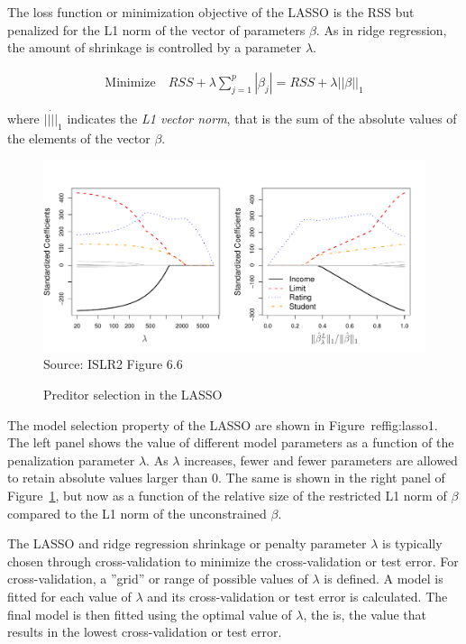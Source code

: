 The loss function or minimization objective of the LASSO is the RSS but penalized for the L1 norm of the vector of parameters $\beta$. As in ridge regression, the amount of shrinkage is controlled by a parameter $\lambda$.

\begin{align*}
\text{Minimize} \quad RSS + \lambda \sum_{j=1}^p |\beta_j| = RSS + \lambda ||\beta||_1
\end{align*}

\noindent where $||\dot||_1$ indicates the \emph{L1 vector norm}, that is the sum of the absolute values of the elements of the vector $\beta$.

\begin{figure}
\centering
\includegraphics[width=.85\textwidth]{../class11/Figures_Chapters_1-6/Chapter6/6_6.pdf} \\

\scriptsize Source: ISLR2 Figure 6.6
\caption{Preditor selection in the LASSO}
\label{fig:lasso1}
\end{figure}

The model selection property of the LASSO are shown in Figure~ref{fig:lasso1}. The left panel shows the value of different model parameters as a function of the penalization parameter $\lambda$. As $\lambda$ increases, fewer and fewer parameters are allowed to retain absolute values larger than 0. The same is shown in the right panel of Figure~\ref{fig:lasso1}, but now as a function of the relative size of the restricted L1 norm of $\beta$ compared to the L1 norm of the unconstrained $\beta$.

The LASSO and ridge regression shrinkage or penalty parameter $\lambda$ is typically chosen through cross-validation to minimize the cross-validation or test error. For cross-validation, a ''grid'' or range of possible values of $\lambda$ is defined. A model is fitted for each value of $\lambda$ and its cross-validation or test error is calculated. The final model is then fitted using the optimal value of $\lambda$, the is, the value that results in the lowest cross-validation or test error.


